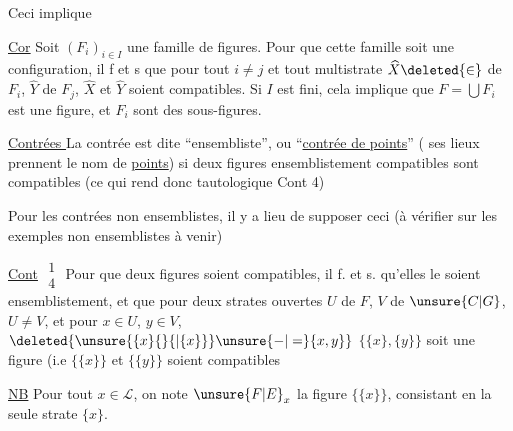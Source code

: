 
\deleted{\uline{Cor} Si $F,G,H$ sont \unsure{. tout|. trois} $(\unsure{F_i|F_j}]$}

 Ceci implique

\uline{Cor} Soit $(F_i)_{i\in I}$ une famille  de figures. Pour que  cette famille soit une configuration, il f et s que pour tout $i\ne j$ et tout multistrate $\widehat{X}\deleted{\in}$ de $F_i$, $\widehat{Y}$ de $F_j$, $\widehat{X}$ et $\widehat{Y}$ soient compatibles. Si $I$ est fini, cela implique que $F=\bigcup F_i$ est une figure, et  $F_i$  sont des sous-figures.


\uline{Contrées } La contrée est dite ``ensembliste'', ou ``\uline{contrée de points}'' ( ses lieux prennent le nom de \uline{points}) si deux figures ensemblistement compatibles sont compatibles (ce qui rend donc tautologique Cont 4)


Pour les contrées non ensemblistes, il y a lieu de supposer ceci (à vérifier sur les exemples non ensemblistes à venir)

\uline{Cont} $\substack{1\\4}$ Pour que deux figures  soient \margin{\rule{0.35pt}{4.5\baselineskip}}compatibles, il f. et s. qu'elles le soient ensemblistement, et que pour deux  strates ouvertes $U$ de $F$, $V$ de $\unsure{C|G}$, $U\ne V$,  et pour  $x\in U$, $y\in V$, $\deleted{\unsure{\{x\}\{\}\{|\{x\}\}}\unsure{-|=}\{x,y\}}$ $\{\{x\},\{y\}\}$ soit une figure (i.e $\{\{x\}\}$ et $\{\{y\}\}$ soient compatibles


\uline{NB} Pour tout $x\in \mathcal L$, on note $\unsure{F|E}_x$ la figure $\{\{x\}\}$, consistant en la seule strate $\{x\}$.


